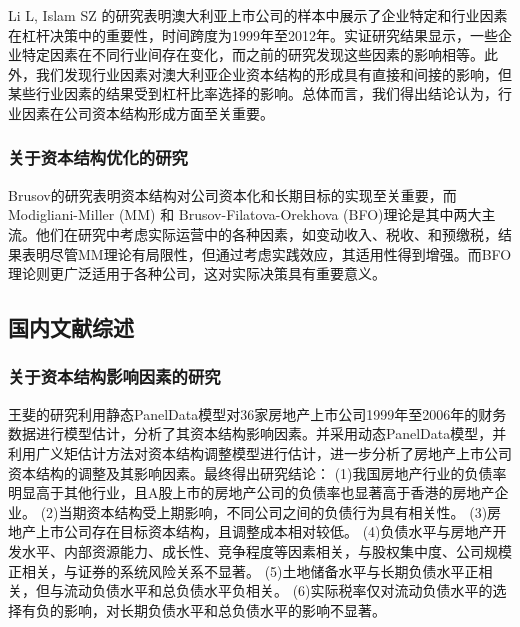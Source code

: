 Li L, Islam SZ 的研究表明澳大利亚上市公司的样本中展示了企业特定和行业因素在杠杆决策中的重要性，时间跨度为1999年至2012年。实证研究结果显示，一些企业特定因素在不同行业间存在变化，而之前的研究发现这些因素的影响相等。此外，我们发现行业因素对澳大利亚企业资本结构的形成具有直接和间接的影响，但某些行业因素的结果受到杠杆比率选择的影响。总体而言，我们得出结论认为，行业因素在公司资本结构形成方面至关重要。\cite{Li2019a}
\subsubsection{关于资本结构优化的研究}
Brusov的研究表明资本结构对公司资本化和长期目标的实现至关重要，而Modigliani-Miller (MM) 和 Brusov-Filatova-Orekhova (BFO)理论是其中两大主流。他们在研究中考虑实际运营中的各种因素，如变动收入、税收、和预缴税，结果表明尽管MM理论有局限性，但通过考虑实践效应，其适用性得到增强。而BFO理论则更广泛适用于各种公司，这对实际决策具有重要意义。\cite{Brusov2023}

\subsection{国内文献综述}

\subsubsection{关于资本结构影响因素的研究}
王斐的研究利用静态PanelData模型对36家房地产上市公司1999年至2006年的财务数据进行模型估计，分析了其资本结构影响因素。并采用动态PanelData模型，并利用广义矩估计方法对资本结构调整模型进行估计，进一步分析了房地产上市公司资本结构的调整及其影响因素。最终得出研究结论：
(1)我国房地产行业的负债率明显高于其他行业，且A股上市的房地产公司的负债率也显著高于香港的房地产企业。
(2)当期资本结构受上期影响，不同公司之间的负债行为具有相关性。
(3)房地产上市公司存在目标资本结构，且调整成本相对较低。
(4)负债水平与房地产开发水平、内部资源能力、成长性、竞争程度等因素相关，与股权集中度、公司规模正相关，与证券的系统风险关系不显著。
(5)土地储备水平与长期负债水平正相关，但与流动负债水平和总负债水平负相关。
(6)实际税率仅对流动负债水平的选择有负的影响，对长期负债水平和总负债水平的影响不显著。 \cite{Wang2008}

